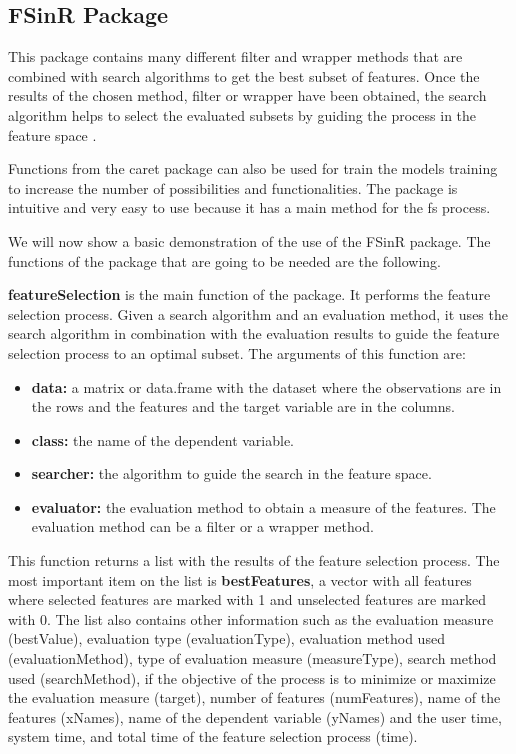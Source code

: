 \subsection{FSinR Package}
\label{sec:fsinr-package}

This package contains many different filter and wrapper methods that are combined with search algorithms to get the best subset of features. Once the results of the chosen method, filter or wrapper have been obtained, the search algorithm helps to select the evaluated subsets by guiding the process in the feature space \cite{fsinr}.

Functions from the \acrshort{caret} package \cite{caret} can also be used for train the models training to increase the number of possibilities and functionalities. The package is intuitive and very easy to use because it has a main method for the \acrshort{fs} process.

We will now show a basic demonstration of the use of the FSinR package. The functions of the package that are going to be needed are the following.

\textbf{featureSelection} is the main function of the package. It performs the feature selection process. Given a search algorithm and an evaluation method, it uses the search algorithm in combination with the evaluation results to guide the feature selection process to an optimal subset. The arguments of this function are:

\begin{itemize}
    \item \textbf{data:} a matrix or data.frame with the dataset where the observations are in the rows and the features and the target variable are in the columns.
    
    \item \textbf{class:} the name of the dependent variable.
    
    \item \textbf{searcher:} the algorithm to guide the search in the feature space.
    
    \item \textbf{evaluator:} the evaluation method to obtain a measure of the features. The evaluation method can be a filter or a wrapper method.
\end{itemize}

This function returns a list with the results of the feature selection process. The most important item on the list is \textbf{bestFeatures}, a vector with all features where selected features are marked with 1 and unselected features are marked with 0. The list also contains other information such as the evaluation measure (bestValue), evaluation type (evaluationType), evaluation method used (evaluationMethod), type of evaluation measure (measureType), search method used (searchMethod), if the objective of the process is to minimize or maximize the evaluation measure (target), number of features (numFeatures), name of the features (xNames), name of the dependent variable (yNames) and the user time, system time, and total time of the feature selection process (time).

